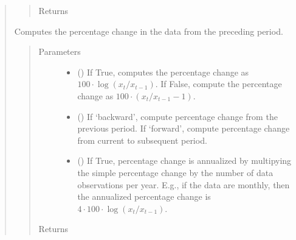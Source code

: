 \documentclass[letterpaper,10pt,openany,oneside,english]{sphinxmanual}
\begin{document}
\begin{fulllineitems}
\begin{quote}
\begin{fulllineitems}
\begin{quote}
\begin{description}
\item[{Returns}] \leavevmode
{\hyperref[\detokenize{series_class:fredpy.series}]{}}

\end{description}\end{quote}

\end{fulllineitems}


\begin{fulllineitems}
\label{\detokenize{series_class:fredpy.series.pc}}
Computes the percentage change in the data from the preceding period.
\begin{quote}\begin{description}
\item[{Parameters}] \leavevmode\begin{itemize}
\item {} 
 () \textendash{} If True, computes the percentage change as \(100\cdot\log(x_{t}/x_{t-1})\). If False, compute the percentage change as \(100\cdot\left( x_{t}/x_{t-1} - 1\right)\).

\item {} 
 () \textendash{} If ‘backward’, compute percentage change from the previous period. If ‘forward’, compute percentage change from current to subsequent period.

\item {} 
 () \textendash{} If True, percentage change is annualized by multipying the simple percentage change by the number of data observations per year. E.g., if the data are monthly, then the annualized percentage change is \(4\cdot 100\cdot\log(x_{t}/x_{t-1})\).

\end{itemize}

\item[{Returns}] \leavevmode
{\hyperref[\detokenize{series_class:fredpy.series}]{}}


\end{description}
\end{quote}
\end{fulllineitems}
\end{quote}
\end{fulllineitems}
\end{document}
